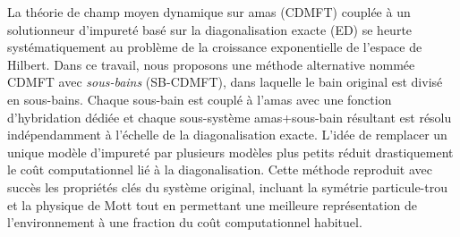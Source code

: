 La théorie de champ moyen dynamique sur amas (CDMFT) couplée à un solutionneur d'impureté basé sur la diagonalisation exacte (ED) se heurte systématiquement au problème de la croissance exponentielle de l'espace de Hilbert. Dans ce travail, nous proposons une méthode alternative nommée CDMFT avec \textit{sous-bains} (SB-CDMFT), dans laquelle le bain original est divisé en sous-bains. Chaque sous-bain est couplé à l'amas avec une fonction d'hybridation dédiée et chaque sous-système amas+sous-bain résultant est résolu indépendamment à l'échelle de la diagonalisation exacte. L'idée de remplacer un unique modèle d'impureté par plusieurs modèles plus petits réduit drastiquement le coût computationnel lié à la diagonalisation. Cette méthode reproduit avec succès les propriétés clés du système original, incluant la symétrie particule-trou et la physique de Mott tout en permettant une meilleure représentation de l'environnement à une fraction du coût computationnel habituel.

\clearpage
